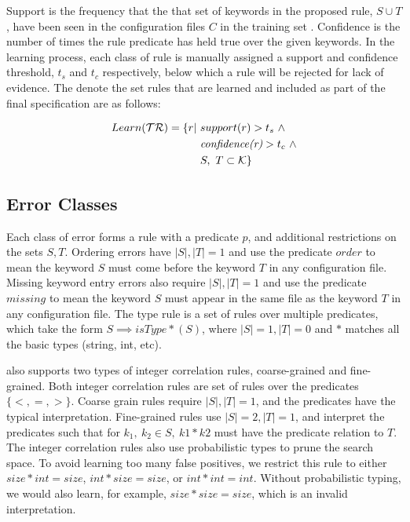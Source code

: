 Support is the frequency that the that set of keywords in the proposed rule, $S \cup T$, have been seen in the configuration files $C$ in the training set \trainingSet.
Confidence is the number of times the rule predicate has held true over the given keywords.
In the learning process, each class of rule is manually assigned a support and confidence threshold, $t_s$ and $t_c$ respectively, below which a rule will be rejected for lack of evidence.
The denote the set rules that are learned and included as part of the final specification are as follows:

\begin{align}
Learn(\mathcal{TR}) = \{r | \ &support(r) > t_s\ \land \nonumber \\
    & \textit{confidence(r)} > t_c\ \land \label{eq:learn}\\ 
    & S,\ T \subset \mathcal{K}\} \nonumber
\end{align}

\subsection{Error Classes}
Each class of error forms a rule with a predicate $p$, and additional restrictions on the sets $S, T$.
Ordering errors have $|S|, |T| = 1$ and use the predicate $order$ to mean the keyword $S$ must come before the keyword $T$ in any configuration file.
Missing keyword entry errors also require $|S|, |T| = 1$ and use the predicate $missing$ to mean the keyword $S$ must appear in the same file as the keyword $T$ in any configuration file.
The type rule is a set of rules over multiple predicates, which take the
form $S \implies \textit{isType}\ast(S)$, where $|S|=1, |T|=0$ and $\ast$ matches all the basic types (string, int, etc).

\app also supports two types of integer correlation rules, coarse-grained and fine-grained.
Both integer correlation rules are set of rules over the predicates $\{<,=,>\}$.
Coarse grain rules require $|S|, |T| = 1$, and the predicates have the typical interpretation.
Fine-grained rules use $|S|=2,|T|=1$, and interpret the predicates such that for $k_1,\ k_2 \in S,\ k1*k2$ must have the predicate relation to $T$.
The integer correlation rules also use probabilistic types to prune the search space.
To avoid learning too many false positives, we restrict this rule to either $size*int=size$, $int*size=size$, or $int*int = int$.
Without probabilistic typing, we would also learn, for example, $size*size=size$, which is an invalid interpretation.

